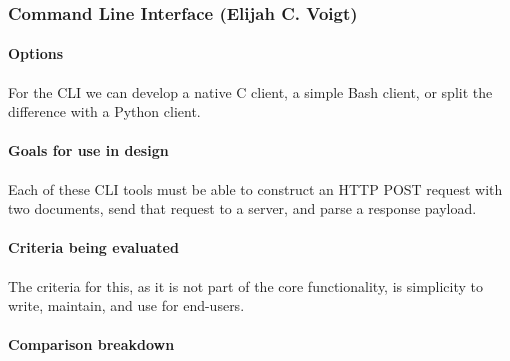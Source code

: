 \subsubsection{Command Line Interface (Elijah C. Voigt)}

\paragraph{Options}

For the CLI we can develop a native C client, a simple Bash client, or split the difference with a Python client.

\paragraph{Goals for use in design}

Each of these CLI tools must be able to construct an HTTP POST request with two documents, send that request to a server, and parse a response payload.

\paragraph{Criteria being evaluated}

The criteria for this, as it is not part of the core functionality, is simplicity to write, maintain, and use for end-users.

\paragraph{Comparison breakdown}

